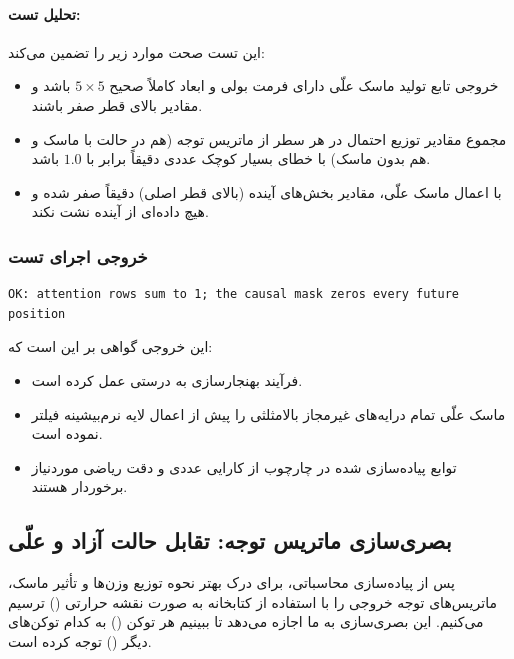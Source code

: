 \documentclass{article}
\begin{document}
\paragraph{تحلیل تست:}
این تست صحت موارد زیر را تضمین می‌کند:
\begin{itemize}
	\item خروجی تابع تولید ماسک علّی دارای فرمت بولی و ابعاد کاملاً صحیح $5\times 5$ باشد و مقادیر بالای قطر  صفر باشند.
	\item مجموع مقادیر توزیع احتمال در هر سطر از ماتریس توجه (هم در حالت با ماسک و هم بدون ماسک) با خطای بسیار کوچک عددی دقیقاً برابر با $1.0$ باشد.
	\item با اعمال ماسک علّی، مقادیر بخش‌های آینده (بالای قطر اصلی) دقیقاً صفر شده و هیچ داده‌ای از آینده نشت نکند.
\end{itemize}

\subsubsection*{خروجی اجرای تست}
\begin{latin}
	\begin{lstlisting}[basicstyle=\ttfamily\small, frame=single]
		OK: attention rows sum to 1; the causal mask zeros every future position
	\end{lstlisting}
\end{latin}

این خروجی گواهی بر این است که:
\begin{itemize}
	\item فرآیند بهنجارسازی به درستی عمل کرده است.
	\item ماسک علّی تمام درایه‌های غیرمجاز بالا‌مثلثی را پیش از اعمال لایه نرم‌بیشینه فیلتر نموده است.
	\item توابع پیاده‌سازی شده در چارچوب  از کارایی عددی و دقت ریاضی موردنیاز برخوردار هستند.
\end{itemize}



\subsection{بصری‌سازی ماتریس توجه: تقابل حالت آزاد و علّی}

پس از پیاده‌سازی محاسباتی، برای درک بهتر نحوه توزیع وزن‌ها و تأثیر ماسک، ماتریس‌های توجه خروجی را با استفاده از کتابخانه  به صورت نقشه حرارتی () ترسیم می‌کنیم. این بصری‌سازی به ما اجازه می‌دهد تا ببینیم هر توکن () به کدام توکن‌های دیگر () توجه کرده است.
\end{document}
